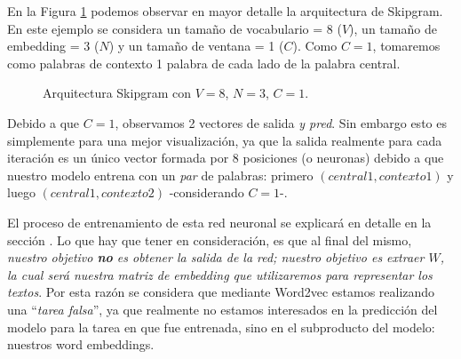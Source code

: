 \documentclass[12pt,a4paper]{article}
\begin{document}
\begin{sloppypar}
En la Figura \ref{fig:Imagen_NLP_23} podemos observar en mayor detalle la arquitectura de Skipgram. En este ejemplo se considera un tamaño de vocabulario = 8 ($V$), un tamaño de embedding = 3 ($N$) y un tamaño de ventana = 1 ($C$). Como $C=1$, tomaremos como palabras de contexto 1 palabra de cada lado de la palabra central.

\begin{figure}[H]  
\centering
\noindent{}
\caption{Arquitectura Skipgram con $V=8$, $N=3$, $C=1$.}
\label{fig:Imagen_NLP_23}
\end{figure}

Debido a que $C=1$, observamos 2 vectores de salida \textit{y pred}. Sin embargo esto es simplemente para una mejor visualización, ya que la salida realmente para cada iteración es un único vector formada por 8 posiciones (o neuronas) debido a que nuestro modelo entrena con un \textit{par} de palabras: primero $(central1, contexto1)$ y luego $(central1, contexto2)$ -considerando $C=1$-. 

El proceso de entrenamiento de esta red neuronal se explicará en detalle en la sección \textit{}. Lo que hay que tener en consideración, es que al final del mismo, \textit{nuestro objetivo \textbf{no} es obtener la salida de la red; nuestro objetivo es extraer $W$, la cual será nuestra matriz de embedding que utilizaremos para representar los textos}. Por esta razón se considera que mediante Word2vec estamos realizando una “\textit{tarea falsa}”, ya que realmente no estamos interesados en la predicción del modelo para la tarea en que fue entrenada, sino en el subproducto del modelo: nuestros word embeddings.


\end{sloppypar}
\end{document}
